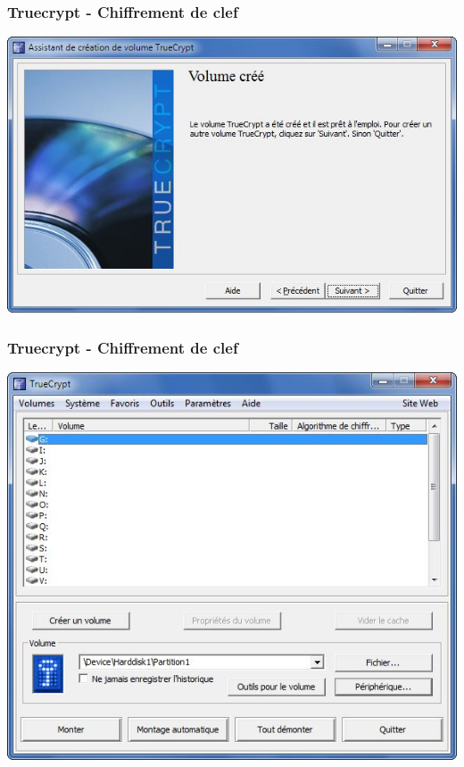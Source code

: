 \documentclass{beamer}
\begin{document}
\begin{frame}
\frametitle{Truecrypt - Chiffrement de clef}
\begin{center}
\includegraphics[scale=0.5] {./images/Truecrypt35.jpg} 
\end{center}
\end{frame}
\begin{frame}
\frametitle{Truecrypt - Chiffrement de clef}
\begin{center}
\includegraphics[scale=0.5] {./images/Truecrypt37.jpg} 
\end{center}
\end{frame}
\end{document}
